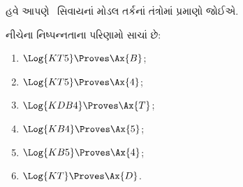 \begingroup
\makeatletter{}\makeatother


\label{guunit:OLP-0435}


હવે આપણે~ સિવાયનાં મોડલ તર્કનાં તંત્રોમાં પ્રમાણો જોઈએ.

\begin{prop}
નીચેના નિષ્પન્નતાના પરિણામો સાચાં છે:
  \begin{enumerate}
  \item $\Log{KT5} \Proves \Ax{B}$;
  \item $\Log{KT5} \Proves \Ax{4}$;
  \item $\Log{KDB4} \Proves \Ax{T}$;
  \item $\Log{KB4} \Proves \Ax{5}$;
  \item $\Log{KB5} \Proves \Ax{4}$;
  \item {}$\Log{KT} \Proves \Ax{D}$.
  \end{enumerate}
\end{prop}

